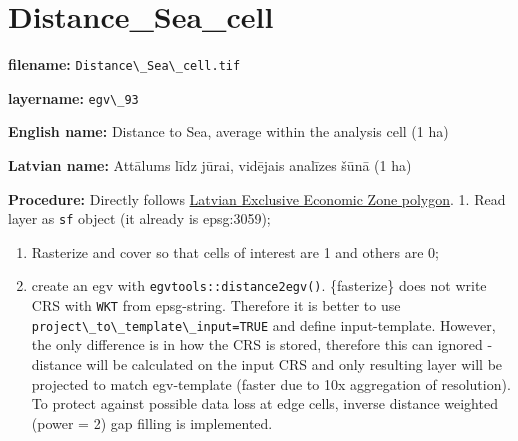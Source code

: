 \documentclass[
]{book}
\newcommand{\passthrough}[1]{#1}
\begin{document}
\section{Distance\_Sea\_cell}\label{ch06.093}

\textbf{filename:} \passthrough{\lstinline!Distance\_Sea\_cell.tif!}

\textbf{layername:} \passthrough{\lstinline!egv\_93!}

\textbf{English name:} Distance to Sea, average within the analysis cell (1 ha)

\textbf{Latvian name:} Attālums līdz jūrai, vidējais analīzes šūnā (1 ha)

\textbf{Procedure:} Directly follows \hyperref[Ch04.16]{Latvian Exclusive Economic Zone polygon}.
1. Read layer as \passthrough{\lstinline!sf!} object (it already is epsg:3059);

\begin{enumerate}
\def\labelenumi{\arabic{enumi}.}
\setcounter{enumi}{1}
\item
  Rasterize and cover so that cells of interest are 1 and others are 0;
\item
  create an egv with \passthrough{\lstinline!egvtools::distance2egv()!}. \{fasterize\} does not write CRS
  with \passthrough{\lstinline!WKT!} from epsg-string. Therefore it is better to use \passthrough{\lstinline!project\_to\_template\_input=TRUE!} and
  define input-template. However, the only difference is in how the CRS is stored,
  therefore this can ignored - distance will be calculated on the input CRS and only
  resulting layer will be projected to match egv-template (faster due to 10x aggregation of
  resolution). To protect against possible data loss at edge cells,
  inverse distance weighted (power = 2) gap filling is implemented.
\end{enumerate}
\end{document}
